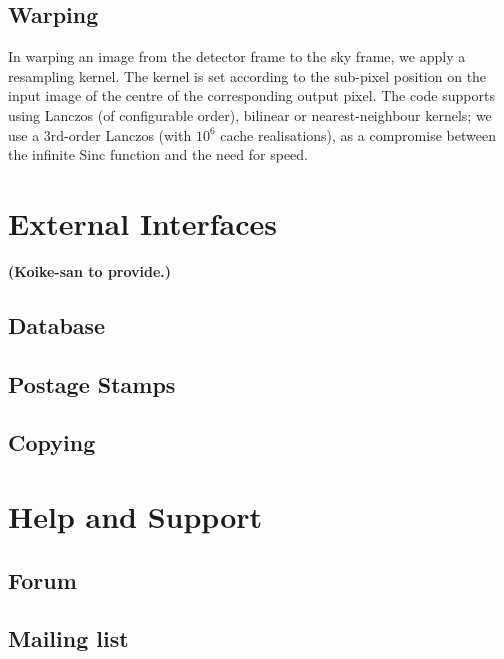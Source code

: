 \documentclass[12pt]{article}
\newcommand\tbd[1]{\textbf{\color{red}(#1)}}
\begin{document}
\subsection{Warping}

In warping an image from the detector frame to the sky frame, we apply a resampling kernel.  The kernel is set
according to the sub-pixel position on the input image of the centre of the corresponding output pixel.  The
code supports using Lanczos (of configurable order), bilinear or nearest-neighbour kernels; we use a 3rd-order
Lanczos (with $10^6$ cache realisations), as a compromise between the infinite Sinc function and the need for
speed.


\section{External Interfaces}
\label{sec:interfaces}
\tbd{Koike-san to provide.}
\subsection{Database}
\subsection{Postage Stamps}
\subsection{Copying}

\section{Help and Support}
\label{sec:support}
\subsection{Forum}
\subsection{Mailing list}

\clearpage



\end{document}
